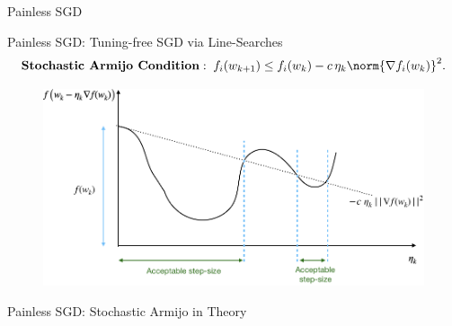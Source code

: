 \documentclass[notheorems]{beamer}
\begin{document}

    \begin{frame}{}
        \begin{center}
        \huge Painless SGD
        \end{center}
    \end{frame}


    \begin{frame}{Painless SGD: Tuning-free SGD via Line-Searches}
        \vspace{0.6em}
        \[ \textbf{Stochastic Armijo Condition}: \; f_i(w_{k+1}) \leq f_i(w_k) - c \, \eta_k \norm{\nabla f_i(w_k)}^2. \]
        \begin{figure}
            \centering
            \includegraphics[width=\textwidth]{figures/armijo}
        \end{figure}

    \end{frame}

    \begin{frame}{Painless SGD: Stochastic Armijo in Theory}
        \begin{figure}
            \vspace{0.5em}

            \vspace{0.5em}

        \end{figure}
    \end{frame}
\end{document}
